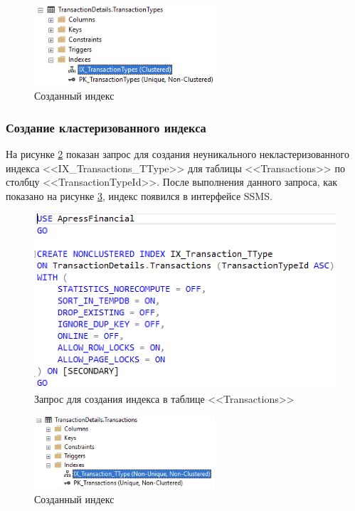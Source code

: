 \documentclass[a4paper, 14pt]{extarticle}
\begin{document}
\begin{figure}[H]
  \centering
  \includegraphics[width=0.6\textwidth]{images/task-3/2.png}
  \caption{Созданный индекс}
  \label{fig:task-3-2}
\end{figure}

\subsubsection{Создание кластеризованного индекса}

На рисунке \ref{fig:task-3-3} показан запрос для создания неуникального
некластеризованного индекса
<<\foreignlanguage{english}{IX\_Transactions\_TType}>> для таблицы
<<\foreignlanguage{english}{Transactions}>> по столбцу
<<\foreignlanguage{english}{TransactionTypeId}>>. После выполнения данного
запроса, как показано на рисунке \ref{fig:task-3-4}, индекс появился в
интерфейсе SSMS.

\begin{figure}[H]
  \centering
  \includegraphics[width=\textwidth]{images/task-3/3.png}
  \caption{Запрос для создания индекса в таблице <<Transactions>>}
  \label{fig:task-3-3}
\end{figure}

\begin{figure}[H]
  \centering
  \includegraphics[width=0.6\textwidth]{images/task-3/4.png}
  \caption{Созданный индекс}
  \label{fig:task-3-4}
\end{figure}
\end{document}
